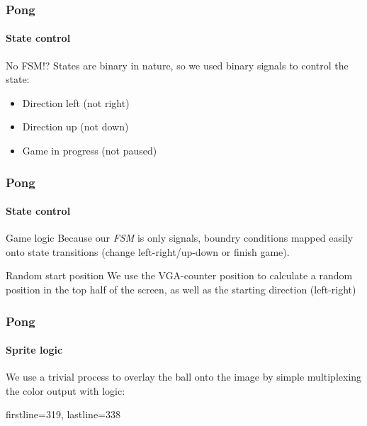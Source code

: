 \documentclass{beamer}
\begin{document}
\begin{frame}
    \frametitle{Pong}
    \framesubtitle{State control}
    \begin{alertblock}{No FSM!?}
        States are binary in nature, so we used binary signals to control the state:
        \begin{itemize}
            \item Direction left (not right)
            \item Direction up (not down)
            \item Game in progress (not paused)
        \end{itemize}
    \end{alertblock}
\end{frame}

\begin{frame}
    \frametitle{Pong}
    \framesubtitle{State control }
    \begin{block}{Game logic}
        Because our \emph{FSM} is only signals, boundry conditions mapped easily onto state transitions (change left-right/up-down or finish game).
    \end{block}
    \begin{block}{Random start position}
        We use the VGA-counter position to calculate a random position in the top half of the screen, as well as the starting direction (left-right)
    \end{block}
\end{frame}


\begin{frame}[fragile]
    \frametitle{Pong}
    \framesubtitle{Sprite logic}
    We use a trivial process to overlay the ball onto the image by simple multiplexing the color output with logic:
    
    firstline=319, lastline=338
\end{frame}
\end{document}
